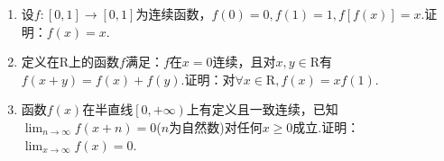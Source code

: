 \begin{enumerate}
\item 设$f : [ 0,1 ] \rightarrow [ 0,1 ]$为连续函数，$f ( 0 ) = 0 , f ( 1 ) = 1 , f [ f ( x ) ] = x$.证明：$f(x)=x$.
\item 定义在$\mathrm{R}$上的函数$f$满足：$f$在$x=0$连续，且对$x,y\in \mathrm{R}$有$f(x+y)=f(x)+f(y)$.证明：对$\forall x\in \mathrm{R},f(x)=xf(1)$.
\item 函数$f(x)$在半直线$\left[ 0,+\infty\right) $上有定义且一致连续，已知$\lim _ { n \rightarrow \infty } f ( x + n ) = 0$\quad($ n$为自然数)对任何$x\geq 0$成立.证明：$\lim_{ x \rightarrow  \infty }f(x)=0$.
\end{enumerate}